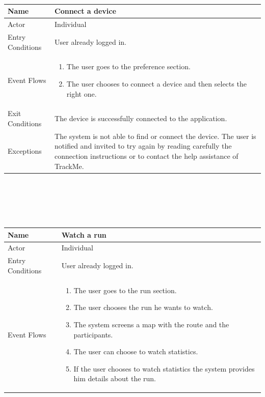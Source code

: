 \documentclass{article}
\begin{document}
\begin{legal}
\begin{legal}
\begin{legal}
\begin{tabular}{| m{3.5cm} | m{8cm}| }
				\end{tabular}\\\\\\
				\begin{tabular}{| m{3.5cm} | m{8cm}| }
				\hline
					Name & Connect a device\\
				\hline
					Actor & Individual\\
				\hline
					Entry Conditions & User already logged in.\\
				\hline
					Event Flows & \begin{enumerate}
									\item The user goes to the preference section.
									\item The user chooses to connect a device and then selects the right one.
				\end{enumerate}\\
				\hline
					Exit Conditions & The device is successfully connected to the application.\\
				\hline
					Exceptions & The system is not able to find or connect the device. The user is notified and invited to try again by reading carefully the connection instructions or to contact the help assistance of TrackMe.\\
				\hline
				\end{tabular}\\
				\\\\\\
				\begin{tabular}{| m{3.5cm} | m{8cm}| }
				\hline
					Name & Watch a run\\
				\hline
					Actor & Individual\\
				\hline
					Entry Conditions & User already logged in.\\
				\hline
					Event Flows & \begin{enumerate}
									\item The user goes to the run section.
									\item The user chooses the run he wants to watch.
									\item The system screens a map with the route and the participants.
									\item The user can choose to watch statistics.
									\item If the user chooses to watch statistics the system provides him details about the run.
				\end{enumerate}\\

\end{tabular}
\end{legal}
\end{legal}
\end{legal}
\end{document}
